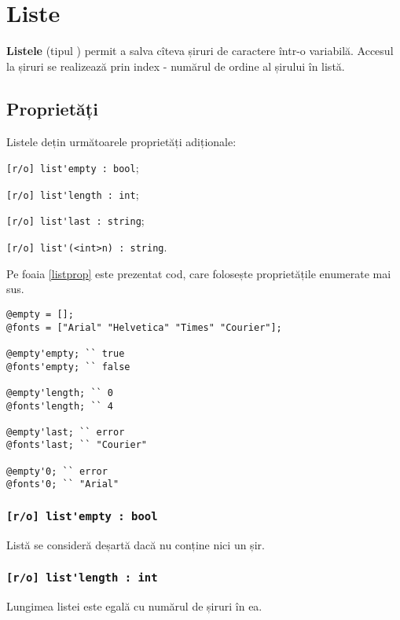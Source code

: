 \section{Liste}

{\bf Listele} (tipul ) permit a salva cîteva șiruri de caractere într-o variabilă. Accesul la șiruri se realizează prin index - numărul de ordine al șirului în listă.

\subsection{Proprietăți}

Listele dețin următoarele proprietăți adiționale:
\begin{icItems}
\item
	\lstinline|[r/o] list'empty : bool|;
\item
	\lstinline|[r/o] list'length : int|;
\item
	\lstinline|[r/o] list'last : string|;
\item
	\lstinline|[r/o] list'(<int>n) : string|.
\end{icItems}

Pe foaia \ref{listprop} este prezentat cod, care folosește proprietățile enumerate mai sus.

\begin{lstlisting}[caption=Proprietățile clasei list, label=listprop]
@empty = [];
@fonts = ["Arial" "Helvetica" "Times" "Courier"];

@empty'empty; `` true
@fonts'empty; `` false

@empty'length; `` 0
@fonts'length; `` 4

@empty'last; `` error
@fonts'last; `` "Courier"

@empty'0; `` error
@fonts'0; `` "Arial"
\end{lstlisting}

\subsubsection{\lstinline|[r/o] list'empty : bool|}

Listă se consideră deșartă dacă nu conține nici un șir.

\subsubsection{\lstinline|[r/o] list'length : int|}

Lungimea listei este egală cu numărul de șiruri în ea.

